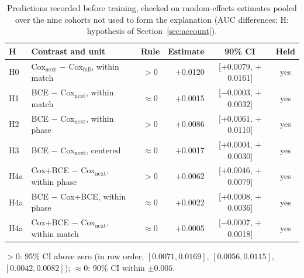 \begin{table}[t]
\centering\footnotesize
\caption{Predictions recorded before training, checked on random-effects estimates pooled over the nine cohorts not used to form the explanation (AUC differences; H: hypothesis of Section~\ref{sec:account}).}
\label{tab:predictions}
\setlength{\tabcolsep}{2.1pt}
\begin{tabular}{llcrcc}
\toprule
H & Contrast and unit & Rule & Estimate & 90\% CI & Held \\
\midrule
H0 & Cox$_{\mathrm{next}}$ $-$ Cox$_{\mathrm{full}}$, within match & $>0$ & $+$0.0120 & [$+$0.0079, $+$0.0161] & yes \\
H1 & BCE $-$ Cox$_{\mathrm{next}}$, within match & $\approx0$ & $+$0.0015 & [$-$0.0003, $+$0.0032] & yes \\
H2 & BCE $-$ Cox$_{\mathrm{next}}$, within phase & $>0$ & $+$0.0086 & [$+$0.0061, $+$0.0110] & yes \\
H3 & BCE $-$ Cox$_{\mathrm{next}}$, centered & $\approx0$ & $+$0.0017 & [$+$0.0004, $+$0.0030] & yes \\
H4a & Cox+BCE $-$ Cox$_{\mathrm{next}}$, within phase & $>0$ & $+$0.0062 & [$+$0.0046, $+$0.0079] & yes \\
H4a & BCE $-$ Cox+BCE, within phase & $\approx0$ & $+$0.0022 & [$+$0.0008, $+$0.0036] & yes \\
H4a & Cox+BCE $-$ Cox$_{\mathrm{next}}$, within match & $\approx0$ & $+$0.0005 & [$-$0.0007, $+$0.0018] & yes \\
\bottomrule
\end{tabular}
\smallskip
\parbox{\columnwidth}{\scriptsize $>0$: 95\% CI above zero (in row order, $[0.0071, 0.0169]$, $[0.0056, 0.0115]$, $[0.0042, 0.0082]$); $\approx0$: 90\% CI within $\pm0.005$.}
\end{table}
